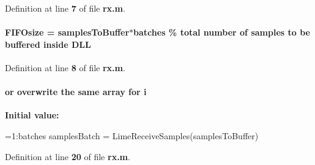 Definition at line {\bf 7} of file {\bf rx.\+m}.

\paragraph[{F\+I\+F\+Osize}]{\setlength{\rightskip}{0pt plus 5cm}F\+I\+F\+Osize = {\bf samples\+To\+Buffer}$\ast${\bf batches} \% total number of {\bf samples} to be buffered inside D\+LL}\label{rx_8m_a9e4e0e42f49900bb440a3163c2382ca0}


Definition at line {\bf 8} of file {\bf rx.\+m}.

\paragraph[{i}]{\setlength{\rightskip}{0pt plus 5cm}or overwrite the same array for i}\label{rx_8m_a39ecfbedb1d27c88aabdefbd7c82dbb7}
{\bfseries Initial value\+:}
\begin{DoxyCode}
=1:batches
    samplesBatch = LimeReceiveSamples(samplesToBuffer)
\end{DoxyCode}


Definition at line {\bf 20} of file {\bf rx.\+m}.



